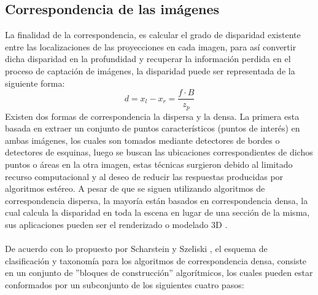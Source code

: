 \subsection{Correspondencia de las imágenes}
La finalidad de la correspondencia, es calcular el grado de disparidad existente entre las localizaciones de las proyecciones en cada imagen, para así convertir dicha disparidad en la profundidad y recuperar la información perdida en el proceso de captación de imágenes, la disparidad puede ser representada de la siguiente forma:
\begin{equation}
d = x_{l} - x_{r} = \frac{f\cdot B}{z_{p}}
\end{equation}
Existen dos formas de correspondencia la dispersa y la densa. La primera esta basada en extraer un conjunto de puntos característicos (puntos de interés) en ambas imágenes, los cuales son tomados mediante detectores de bordes o detectores de esquinas, luego se buscan las ubicaciones correspondientes de dichos puntos o áreas en la otra imagen, estas técnicas surgieron debido al limitado recurso computacional y al deseo de reducir las respuestas producidas por algoritmos estéreo. A pesar de que se siguen utilizando algoritmos de correspondencia dispersa, la mayoría están basados en correspondencia densa, la cual calcula la disparidad en toda la escena en lugar de una sección de la misma, sus aplicaciones pueden ser el renderizado o modelado 3D \cite{Szeliski2022}. 
\\
\\
De acuerdo con lo propuesto por Scharstein y Szeliski \cite{Scharstein2002}, el esquema de clasificación y taxonomía para los algoritmos de correspondencia densa, consiste en un conjunto de ''bloques de construcción'' algorítmicos, los cuales pueden estar conformados por un subconjunto de los siguientes cuatro pasos:
